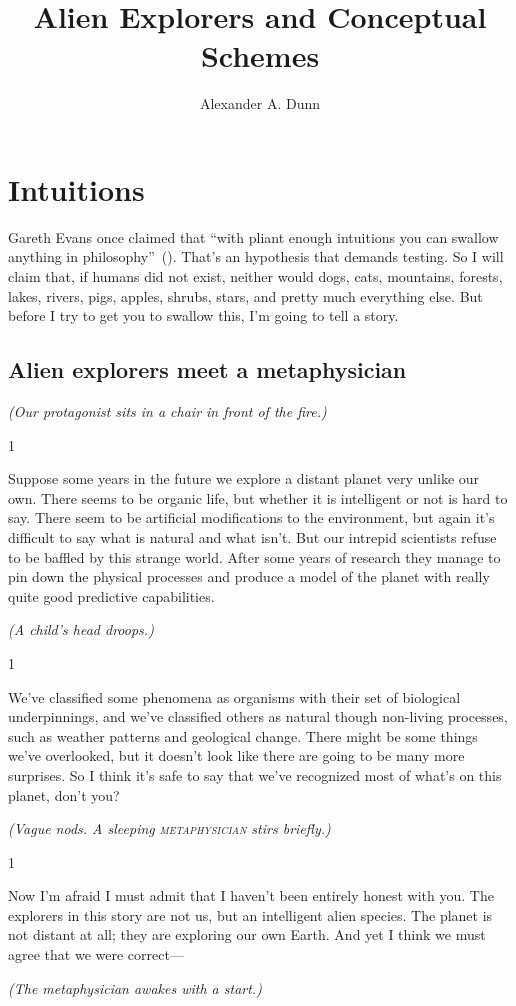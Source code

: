 \documentclass[11pt]{article}
\title{Alien Explorers and Conceptual Schemes}
\author{Alexander A. Dunn}
\newcommand{\stager}[4]%
{%
	\begin{spacing}{1}%
	\vspace{0pt}
		\begin{description}[style=nextline, noitemsep, parsep=0pt, topsep=0pt, leftmargin=15mm, itemindent=-10mm, font=\mdseries]
			\item[\textsc{#1} \emph{#2}] #3
			\item[]%
			\begin{flushright}#4\end{flushright}
		\end{description}%
	\end{spacing}%
}
\begin{document}

\section{Intuitions}
Gareth Evans once claimed that ``with pliant enough intuitions you can swallow anything in philosophy''~(\citeyear[192]{evans1973}). That's an hypothesis that demands testing. So I will claim that, if humans did not exist, neither would dogs, cats, mountains, forests, lakes, rivers, pigs, apples, shrubs, stars, and pretty much everything else. But before I try to get you to swallow this, I'm going to tell a story.

\subsection{Alien explorers meet a metaphysician}
{\em (Our protagonist sits in a chair in front of the fire.)} \\

\stager{Protagonist}{}{Suppose some years in the future we explore a distant planet very unlike our own. There seems to be organic life, but whether it is intelligent or not is hard to say. There seem to be artificial modifications to the environment, but again it's difficult to say what is natural and what isn't. But our intrepid scientists refuse to be baffled by this strange world. After some years of research they manage to pin down the physical processes and produce a model of the planet with really quite good predictive capabilities.}{{\em (A child's head droops.)}}

\stager{Protagonist}{(continuing)}{We've classified some phenomena as organisms with their set of biological underpinnings, and we've classified others as natural though non-living processes, such as weather patterns and geological change. There might be some things we've overlooked, but it doesn't look like there are going to be many more surprises. So I think it's safe to say that we've recognized most of what's on this planet, don't you?}{{\em (Vague nods. A sleeping \textsc{metaphysician} stirs briefly.)}}

\stager{Protagonist}{}{ Now I'm afraid I must admit that I haven't been entirely honest with you. The explorers in this story are not us, but an intelligent alien species. The planet is not distant at all; they are exploring our own Earth. And yet I think we must agree that we were correct---}{{\em (The metaphysician awakes with a start.)}}
\end{document}
